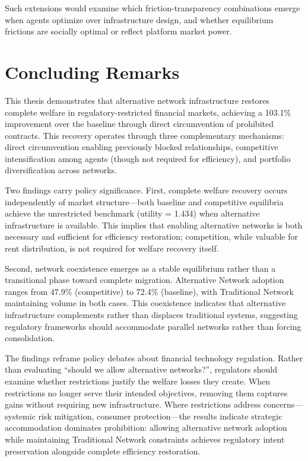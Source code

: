 Such extensions would examine which friction-transparency combinations emerge when agents optimize over infrastructure design, and whether equilibrium frictions are socially optimal or reflect platform market power.

\section{Concluding Remarks}

This thesis demonstrates that alternative network infrastructure restores complete welfare in regulatory-restricted financial markets, achieving a 103.1\% improvement over the baseline through direct circumvention of prohibited contracts. This recovery operates through three complementary mechanisms: direct circumvention enabling previously blocked relationships, competitive intensification among agents (though not required for efficiency), and portfolio diversification across networks.

Two findings carry policy significance. First, complete welfare recovery occurs independently of market structure—both baseline and competitive equilibria achieve the unrestricted benchmark (utility = 1.434) when alternative infrastructure is available. This implies that enabling alternative networks is both necessary and sufficient for efficiency restoration; competition, while valuable for rent distribution, is not required for welfare recovery itself.

Second, network coexistence emerges as a stable equilibrium rather than a transitional phase toward complete migration. Alternative Network adoption ranges from 47.9\% (competitive) to 72.4\% (baseline), with Traditional Network maintaining volume in both cases. This coexistence indicates that alternative infrastructure complements rather than displaces traditional systems, suggesting regulatory frameworks should accommodate parallel networks rather than forcing consolidation.

The findings reframe policy debates about financial technology regulation. Rather than evaluating ``should we allow alternative networks?'', regulators should examine whether restrictions justify the welfare losses they create. When restrictions no longer serve their intended objectives, removing them captures gains without requiring new infrastructure. Where restrictions address concerns—systemic risk mitigation, consumer protection—the results indicate strategic accommodation dominates prohibition: allowing alternative network adoption while maintaining Traditional Network constraints achieves regulatory intent preservation alongside complete efficiency restoration.

